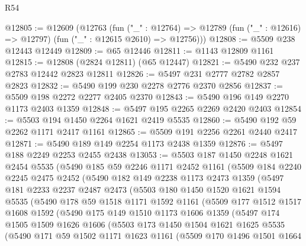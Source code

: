 \begin{lexlean}{R54}
\begin{coremodule}
@12805 := @12609
    (@12763
      (fun ("_" : @12764) =>
      @12789 (fun ("_" : @12616) => @12797) (fun ("_" : @12615 @2610) => @12756)))
@12808 := @5509 @238 @12443 @12449
@12809 := @65 @12446
@12811 := @1143 @12809 @1161
@12815 := @12808 (@2824 @12811) (@65 @12447)
@12821 := @5490 @232 @237 @2783 @12442 @2823 @12811
@12826 := @5497 @231 @2777 @2782 @2857 @2823
@12832 := @5490 @199 @230 @2278 @2776 @2370 @2856
@12837 := @5509 @198 @2272 @2277 @2405 @2370
@12843 := @5490 @196 @149 @2270 @1173 @2403 @1359
@12848 := @5497 @195 @2265 @2269 @2420 @2403
@12854 := @5503 @194 @1450 @2264 @1621 @2419 @5535
@12860 := @5490 @192 @59 @2262 @1171 @2417 @1161
@12865 := @5509 @191 @2256 @2261 @2440 @2417
@12871 := @5490 @189 @149 @2254 @1173 @2438 @1359
@12876 := @5497 @188 @2249 @2253 @2455 @2438
@13053 := @5503
    @187
    @1450
    @2248
    @1621
    @2454
    @5535
    (@5490
      @185
      @59
      @2246
      @1171
      @2452
      @1161
      (@5509
        @184
        @2240
        @2245
        @2475
        @2452
        (@5490
          @182
          @149
          @2238
          @1173
          @2473
          @1359
          (@5497
            @181
            @2233
            @2237
            @2487
            @2473
            (@5503
              @180
              @1450
              @1520
              @1621
              @1594
              @5535
              (@5490
                @178
                @59
                @1518
                @1171
                @1592
                @1161
                (@5509
                  @177
                  @1512
                  @1517
                  @1608
                  @1592
                  (@5490
                    @175
                    @149
                    @1510
                    @1173
                    @1606
                    @1359
                    (@5497
                      @174
                      @1505
                      @1509
                      @1626
                      @1606
                      (@5503
                        @173
                        @1450
                        @1504
                        @1621
                        @1625
                        @5535
                        (@5490
                          @171
                          @59
                          @1502
                          @1171
                          @1623
                          @1161
                          (@5509
                            @170
                            @1496
                            @1501
                            @1664

\end{coremodule}
\end{lexlean}
